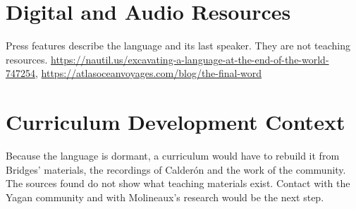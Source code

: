 \documentclass[12pt]{article}
\begin{document}
\section{Digital and Audio Resources}
Press features describe the language and its last speaker. They are not teaching resources. \url{https://nautil.us/excavating-a-language-at-the-end-of-the-world-747254}, \url{https://atlasoceanvoyages.com/blog/the-final-word}

\section{Curriculum Development Context}
Because the language is dormant, a curriculum would have to rebuild it from Bridges' materials, the recordings of Calder\'on and the work of the community. The sources found do not show what teaching materials exist. Contact with the Yagan community and with Molineaux's research would be the next step.
\end{document}

